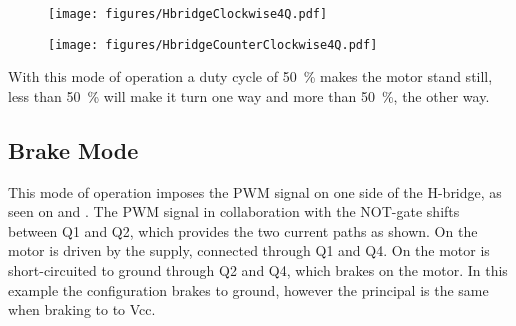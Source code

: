   \begin{minipage}{\linewidth}
  	\begin{minipage}{0.45\linewidth}
  		\begin{figure}[H]
  			\texttt{[image: figures/HbridgeClockwise4Q.pdf]}
  			\centering
  			\vspace{-.4cm}
  			\captionsetup{justification=centering}
  			\label{HbridgeClokwise4Q}
  		\end{figure}\vspace{-5mm}
  	\end{minipage}
  	\hspace{0.03\linewidth}
  	\begin{minipage}{0.45\linewidth}
  		\begin{figure}[H]
  			\texttt{[image: figures/HbridgeCounterClockwise4Q.pdf]}
  			\centering
  			\vspace{-.4cm}
  			\captionsetup{justification=centering}
  			\label{HbridgeCounterClokwise4Q}
  		\end{figure}\vspace{-5mm}
  	\end{minipage}
  \end{minipage}

With this mode of operation a duty cycle of \si{50 \%} makes the motor stand still, less than \si{50 \%} will make it turn one way and more than \si{50 \%}, the other way.

\subsection{Brake Mode}
This mode of operation imposes the PWM signal on one side of the H-bridge, as seen on  and . The PWM signal in collaboration with the NOT-gate shifts between Q1 and Q2, which provides the two current paths as shown. On  the motor is driven by the supply, connected through Q1 and Q4. On  the motor is short-circuited to ground through Q2 and Q4, which brakes on the motor. In this example the configuration brakes to ground, however the principal is the same when braking to to Vcc.\cite{PAndersen}

